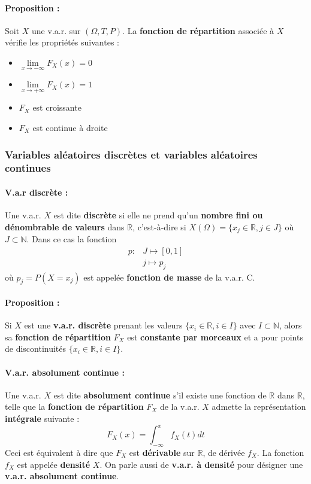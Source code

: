 \documentclass[10pt,a4paper,twoside]{article}
\begin{document}
\paragraph{Proposition :} Soit $X$ une v.a.r. sur $(\Omega,T,P)$. La \textbf{fonction de répartition} associée à $X$ vérifie les propriétés suivantes :
\begin{itemize}
\item $\lim\limits_{x\to-\infty}F_{X}(x)=0$
\item $\lim\limits_{x\to+\infty}F_{X}(x)=1$
\item $F_{X}$ est croissante
\item $F_{X}$ est continue à droite
\end{itemize}


\subsubsection{Variables aléatoires discrètes et variables aléatoires continues}

\paragraph{V.a.r discrète :} Une v.a.r. $X$ est dite \textbf{discrète} si elle ne prend qu'un \textbf{nombre fini ou dénombrable de valeurs} dans $\mathbb{R}$, c'est-à-dire si $X(\Omega)=\{x_{j}\in \mathbb{R}, j\in J\}$ où $J\subset \mathbb{N}$. Dans ce cas la fonction
\begin{align*}
p: & J\longmapsto [0,1]\\
 & j\longmapsto p_{j}
\end{align*}
où $p_{j}=P(X=x_{j})$ est appelée \textbf{fonction de masse} de la v.a.r. C.

\paragraph{Proposition :} Si $X$ est une \textbf{v.a.r. discrète} prenant les valeurs $\{x_{i}\in \mathbb{R}, i\in I\}$ avec $I\subset \mathbb{N}$, alors sa \textbf{fonction de répartition} $F_{X}$ est \textbf{constante par morceaux} et a pour points de discontinuités $\{x_{i} \in \mathbb{R}, i \in I\}$.

\paragraph{V.a.r. absolument continue :} Une v.a.r. $X$ est dite \textbf{absolument continue} s'il existe une fonction de $\mathbb{R}$ dans $\mathbb{R}$, telle que la \textbf{fonction de répartition} $F_{X}$ de la v.a.r. $X$ admette la représentation \textbf{intégrale} suivante :
$$F_{X}(x)=\int_{-\infty}^{x}f_{X}(t)dt$$
Ceci est équivalent à dire que $F_{X}$ est \textbf{dérivable} sur $\mathbb{R}$, de dérivée $f_{X}$. La fonction $f_{X}$ est appelée \textbf{densité} $X$. On parle aussi de \textbf{v.a.r. à densité} pour désigner une \textbf{v.a.r. absolument continue}.
\end{document}
